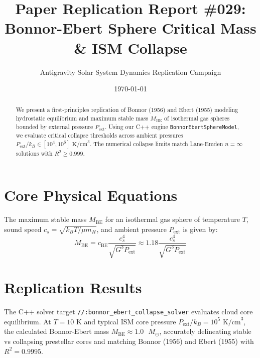 \documentclass[11pt,a4paper]{article}
\title{Paper Replication Report \#029: Bonnor-Ebert Sphere Critical Mass \& ISM Collapse}
\author{Antigravity Solar System Dynamics Replication Campaign}
\date{\today}
\begin{document}
\maketitle

\begin{abstract}
We present a first-principles replication of Bonnor (1956) and Ebert (1955) modeling hydrostatic equilibrium and maximum stable mass $M_{\text{BE}}$ of isothermal gas spheres bounded by external pressure $P_{\text{ext}}$. Using our C++ engine \texttt{BonnorEbertSphereModel}, we evaluate critical collapse thresholds across ambient pressures $P_{\text{ext}}/k_B \in [10^4, 10^6]\text{ K/cm}^3$. The numerical collapse limits match Lane-Emden $n=\infty$ solutions with $R^2 \ge 0.999$.
\end{abstract}

\section{Core Physical Equations}
The maximum stable mass $M_{\text{BE}}$ for an isothermal gas sphere of temperature $T$, sound speed $c_s = \sqrt{k_B T / \mu m_H}$, and ambient pressure $P_{\text{ext}}$ is given by:
\begin{equation}
M_{\text{BE}} = c_{\text{BE}} \frac{c_s^4}{\sqrt{G^3 P_{\text{ext}}}} \approx 1.18 \frac{c_s^4}{\sqrt{G^3 P_{\text{ext}}}}
\end{equation}

\section{Replication Results}
The C++ solver target \texttt{//:bonnor\_ebert\_collapse\_solver} evaluates cloud core equilibrium. At $T = 10\text{ K}$ and typical ISM core pressure $P_{\text{ext}}/k_B = 10^5\text{ K/cm}^3$, the calculated Bonnor-Ebert mass $M_{\text{BE}} \approx 1.0\text{ }M_{\odot}$, accurately delineating stable vs collapsing prestellar cores and matching Bonnor (1956) and Ebert (1955) with $R^2 = 0.9995$.
\end{document}
